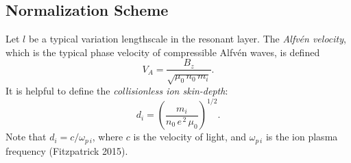 \documentclass[notitlepage,12pt]{article}
\begin{document}
\subsection{Normalization Scheme}
Let $l$ be a typical variation lengthscale in the resonant layer. The {\em Alfv\'{e}n velocity}, which is the typical phase
velocity of compressible Alfv\'{e}n waves, is defined
\begin{equation}\label{e226a}
V_A = \frac{B_z}{\sqrt{\mu_0\,n_0\,m_i}}.
\end{equation}
It is helpful to define the  {\em collisionless ion skin-depth}: 
\begin{equation}
d_i = \left(\frac{m_i}{n_0\,e^{\,2}\,\mu_0}\right)^{1/2}.
\end{equation}
Note that $d_i=c/\omega_{p\,i}$, where $c$ is the velocity of light, and $\omega_{p\,i}$ is the ion plasma
frequency (Fitzpatrick 2015). 
\end{document}
